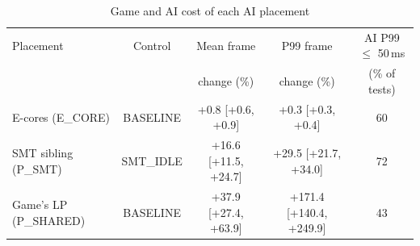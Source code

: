 \begin{table}[t]
\centering
\caption{Game and AI cost of each AI placement}
\label{tab:placement}
\setlength{\tabcolsep}{3pt}
\begin{tabular}{@{}lcccc@{}}
\toprule
Placement & Control & Mean frame & P99 frame & AI P99 $\le$ 50\,ms \\
          &         & change (\%) & change (\%) & (\% of tests) \\
\midrule
E-cores (E\_CORE) & BASELINE & +0.8 [+0.6, +0.9] & +0.3 [+0.3, +0.4] & 60 \\
SMT sibling (P\_SMT) & SMT\_IDLE & +16.6 [+11.5, +24.7] & +29.5 [+21.7, +34.0] & 72 \\
Game's LP (P\_SHARED) & BASELINE & +37.9 [+27.4, +63.9] & +171.4 [+140.4, +249.9] & 43 \\
\bottomrule
\end{tabular}
\end{table}
